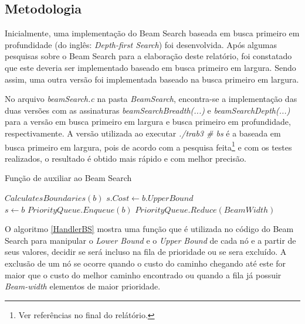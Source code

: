 \documentclass[a4paper,12pt]{article}
\begin{document}
\subsection{Metodologia}

Inicialmente, uma implementação do Beam Search baseada em busca primeiro em profundidade (do inglês: 
\textit{Depth-first Search}) foi desenvolvida. Após algumas pesquisas sobre o Beam Search para a elaboração deste 
relatório, foi constatado que este deveria ser implementado baseado em busca primeiro em largura. Sendo assim, 
uma outra versão foi implementada baseado na busca primeiro em largura.

No arquivo \emph{beamSearch.c} na pasta \emph{BeamSearch}, encontra-se a implementação das duas versões com as assinaturas 
\emph{beamSearchBreadth(...)} e \emph{beamSearchDepth(...)} para a versão em busca primeiro em largura e busca 
primeiro em profundidade, respectivamente. A versão utilizada ao executar \emph{./trab3 \# bs} é a baseada em busca 
primeiro em largura, pois de acordo com a pesquisa feita\footnote{Ver referências no final do relátório.} e com os testes realizados, o resultado é 
obtido mais rápido e com melhor precisão.


\begin{algorithm}[H]
\caption{Função de auxiliar ao Beam Search} \label{HandlerBS}
\begin{algorithmic}[1]
\State $\textit{CalculatesBoundaries}(b)$  
		\State $s.Cost \gets b.UpperBound$
	\EndIf
	\\
			\State $s \gets b$
		\EndIf
	\Else
		\State $PriorityQueue.\textit{Enqueue}(b)$
	\EndIf
\EndIf
\EndFor 
\State $PriorityQueue.\textit{Reduce}(BeamWidth)$    
\EndFunction
\end{algorithmic}
\end{algorithm}


O algoritmo \ref{HandlerBS} mostra uma função que é utilizada no código do Beam Search para manipular o 
\emph{Lower Bound} e o \emph{Upper Bound} de cada nó e a partir de seus valores, decidir se será incluso 
na fila de prioridade ou se sera excluído. A exclusão de um nó se ocorre quando o custo do caminho chegando 
até este for maior que o custo do melhor caminho encontrado ou quando a fila já possuir \emph{Beam-width} 
elementos de maior prioridade.
\end{document}

